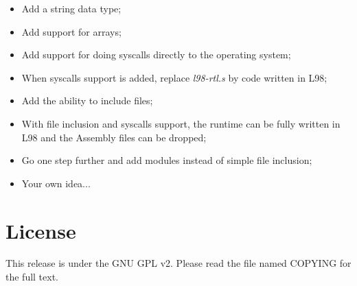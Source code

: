 \documentclass[a4paper, 11pt]{report}
\begin{document}
\begin{itemize}
\item Add a string data type;

\item Add support for arrays;

\item Add support for doing syscalls directly to the operating system;

\item When syscalls support is added, replace \emph{l98-rtl.s} by code written in L98;

\item Add the ability to include files;

\item With file inclusion and syscalls support, the runtime can be fully written in L98 and the
Assembly files can be dropped;

\item Go one step further and add modules instead of simple file inclusion;

\item Your own idea...

\end{itemize}

\chapter{License}

 This release is under the GNU GPL v2. Please read the file named COPYING for the full text.


\begin{thebibliography}{1}
\end{thebibliography}
\end{document}
